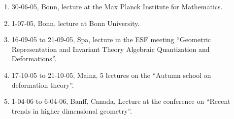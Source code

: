 \documentclass{amsart}
\begin{document}
\begin{enumerate}
\item 30-06-05, Bonn, lecture at the Max Planck Institute for Mathematics.
\item 1-07-05, Bonn, lecture at Bonn University.
\item 16-09-05 to 21-09-05, Spa, lecture in the ESF meeting ``Geometric 
Representation and Invariant Theory Algebraic Quantization and Deformations''.
\item 17-10-05 to 21-10-05, Mainz, 5 lectures on the ``Autumn school on
deformation theory''.
\item 1-04-06 to 6-04-06, Banff, Canada, Lecture at the conference
on ``Recent trends in higher dimensional geometry''. 

\end{enumerate}
\end{document}
